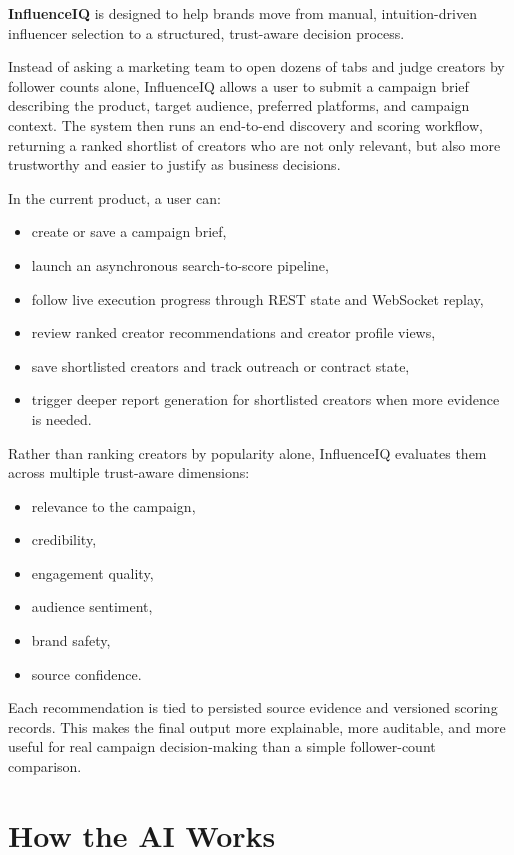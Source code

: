 \documentclass[11pt,a4paper]{article}
\begin{document}
\textbf{InfluenceIQ} is designed to help brands move from manual, intuition-driven influencer selection to a structured, trust-aware decision process.

Instead of asking a marketing team to open dozens of tabs and judge creators by follower counts alone, InfluenceIQ allows a user to submit a campaign brief describing the product, target audience, preferred platforms, and campaign context. The system then runs an end-to-end discovery and scoring workflow, returning a ranked shortlist of creators who are not only relevant, but also more trustworthy and easier to justify as business decisions.

In the current product, a user can:

\begin{itemize}
  \item create or save a campaign brief,
  \item launch an asynchronous search-to-score pipeline,
  \item follow live execution progress through REST state and WebSocket replay,
  \item review ranked creator recommendations and creator profile views,
  \item save shortlisted creators and track outreach or contract state,
  \item trigger deeper report generation for shortlisted creators when more evidence is needed.
\end{itemize}

Rather than ranking creators by popularity alone, InfluenceIQ evaluates them across multiple trust-aware dimensions:

\begin{itemize}
  \item relevance to the campaign,
  \item credibility,
  \item engagement quality,
  \item audience sentiment,
  \item brand safety,
  \item source confidence.
\end{itemize}

Each recommendation is tied to persisted source evidence and versioned scoring records. This makes the final output more explainable, more auditable, and more useful for real campaign decision-making than a simple follower-count comparison.

\section{How the AI Works}
\end{document}
